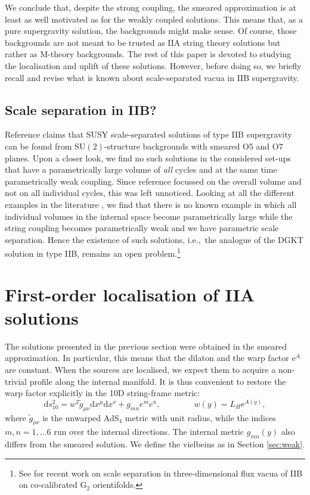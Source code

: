 \documentclass[11pt]{article}
\renewcommand{\[}{\left[}
\renewcommand{\]}{\right]}
\renewcommand{\(}{\left(}
\renewcommand{\)}{\right)}
\renewcommand{\d}{\textrm{d}}
\newcommand{\e}{\textrm{e}}
\newcommand{\<}{\langle}
\renewcommand{\>}{\rangle}
\begin{document}
We conclude that, despite the strong coupling, the smeared approximation is at least as well motivated as for the weakly coupled solutions. This means that, as a pure supergravity solution, the backgrounds might make sense. Of course, those backgrounds are not meant to be trusted as IIA string theory solutions but rather as M-theory backgrounds. The rest of this paper is devoted to studying the localisation and uplift of these solutions. However, before doing so, we briefly recall and revise what is known about scale-separated vacua in IIB supergravity.


\subsection{Scale separation in IIB?}

Reference \cite{Petrini:2013ika} claims that SUSY scale-separated solutions of type IIB supergravity can be found from SU$(2)$-structure backgrounds with smeared O5 and O7 planes. Upon a closer look, we find no such solutions in the considered set-ups that  have a parametrically large volume  of \emph{all} cycles and at the same time parametrically weak coupling. Since reference \cite{Petrini:2013ika} focussed on the overall volume and not on all individual cycles, this was left unnoticed. Looking at all the different examples in the literature \cite{Caviezel:2009tu,Petrini:2013ika}, we find that there is no known example in which all individual volumes in the internal space become parametrically large while the string coupling becomes parametrically weak and we have parametric scale separation. Hence the existence of such solutions, i.e.,~the analogue of the DGKT \cite{DeWolfe:2005uu} solution in type IIB, remains an open problem.\footnote{See \cite{Emelin:2021gzx} for recent work on scale separation in three-dimensional flux vacua of IIB on co-calibrated G$_2$ orientifolds.}


\section{First-order localisation of IIA solutions}
\label{sec:locIIA}

The solutions presented in the previous section were obtained in the smeared approximation. In particular, this means that the dilaton and the warp factor $\e^{A}$ are constant.
When the sources are localised, we expect them to acquire a non-trivial profile along the internal manifold. It is thus convenient to restore the warp factor explicitly in the 10D string-frame metric:
\begin{equation} \label{IIAmetric}
    \d s^2_{10} = w^2 \tilde g_{\mu \nu}\d x^\mu \d x^\nu + g_{mn} e^m e^n, \qquad\qquad w(y) = L_H \e^{A(y)} ,
\end{equation}
where $\tilde g_{\mu\nu}$ is the unwarped AdS$_4$ metric with unit radius, while the indices $m,n=1,\dots 6$ run over the internal directions. The internal metric $g_{mn}(y)$ also differs from the smeared solution. We define the vielbeins as in Section \ref{sec:weak}.
\end{document}
